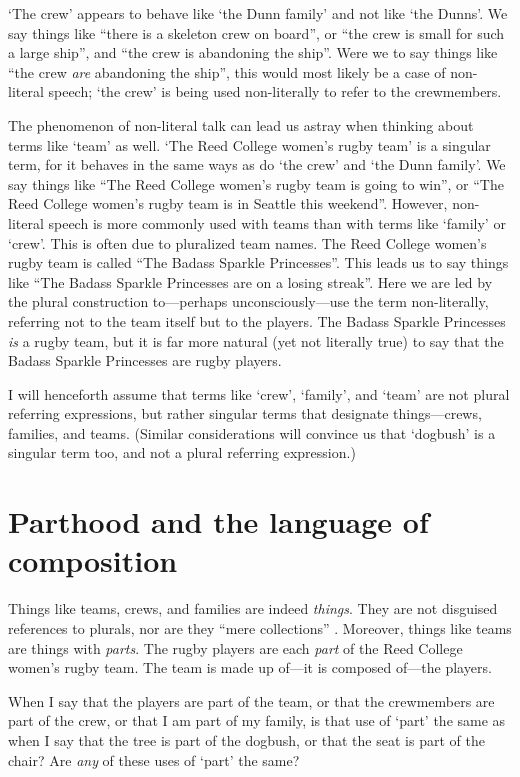 \documentclass[11pt]{article}
\begin{document}
\begin{spacing}{1.25}
`The crew' appears to behave like `the Dunn family' and not like `the
Dunns'.  We say things like ``there is a skeleton crew on board'', or
``the crew is small for such a large ship'', and ``the crew is
abandoning the ship''.  Were we to say things like ``the crew {\em
  are} abandoning the ship'', this would most likely be a case of
non-literal speech; `the crew' is being used non-literally to refer to
the crewmembers.

The phenomenon of non-literal talk can lead us astray when thinking
about terms like `team' as well.  `The Reed College women's rugby
team' is a singular term, for it behaves in the same ways as do `the
crew' and `the Dunn family'.  We say things like ``The Reed College
women's rugby team is going to win'', or ``The Reed College women's
rugby team is in Seattle this weekend''.  However, non-literal speech
is more commonly used with teams than with terms like `family' or
`crew'.  This is often due to pluralized team names.  The Reed College
women's rugby team is called ``The Badass Sparkle Princesses''.  This
leads us to say things like ``The Badass Sparkle Princesses are on a
losing streak''.  Here we are led by the plural construction
to---perhaps unconsciously---use the term non-literally, referring not
to the team itself but to the players.  The Badass Sparkle Princesses
{\em is} a rugby team, but it is far more natural (yet not literally
true) to say that the Badass Sparkle Princesses are rugby players.

I will henceforth assume that terms like `crew', `family', and `team'
are not plural referring expressions, but rather singular terms that
designate things---crews, families, and teams.  (Similar
considerations will convince us that `dogbush' is a singular term too,
and not a plural referring expression.)

\section{Parthood and the language of composition}
\label{part}
Things like teams, crews, and families are indeed {\em things}.  They
are not disguised references to plurals, nor are they ``mere
collections'' \citep[29]{inwagen2009}.  Moreover, things like teams
are things with {\em parts}.  The rugby players are each {\em part} of
the Reed College women's rugby team.  The team is made up of---it is
composed of---the players.

When I say that the players are part of the team, or that the
crewmembers are part of the crew, or that I am part of my family, is
that use of `part' the same as when I say that the tree is part of the
dogbush, or that the seat is part of the chair?  Are {\em any} of
these uses of `part' the same?


\end{spacing}
\end{document}
